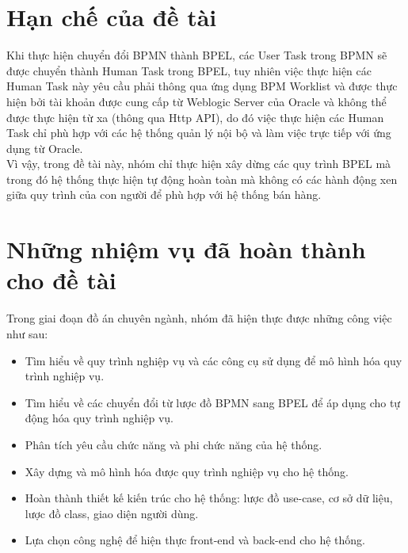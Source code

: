 \section{Hạn chế của đề tài}
\hspace{0.5cm} Khi thực hiện chuyển đổi BPMN thành BPEL, các User Task trong BPMN sẽ được chuyển thành Human Task trong BPEL, tuy nhiên việc thực hiện các Human Task này yêu cầu phải thông qua ứng dụng BPM Worklist và được thực hiện bởi tài khoản được cung cấp từ Weblogic Server của Oracle và không thể được thực hiện từ xa (thông qua Http API), do đó việc thực hiện các Human Task chỉ phù hợp với các hệ thống quản lý nội bộ và làm việc trực tiếp với ứng dụng từ Oracle. \\

Vì vậy, trong đề tài này, nhóm chỉ thực hiện xây dừng các quy trình BPEL mà trong đó hệ thống thực hiện tự động hoàn toàn mà không có các hành động xen giữa quy trình của con người để phù hợp với hệ thống bán hàng.


\section{Những nhiệm vụ đã hoàn thành cho đề tài}
Trong giai đoạn đồ án chuyên ngành, nhóm đã hiện thực được những công việc như sau:
\begin{itemize}
    \item Tìm hiểu về quy trình nghiệp vụ và các công cụ sử dụng để mô hình hóa quy trình nghiệp vụ.
    \item Tìm hiểu về các chuyển đổi từ lược đồ BPMN sang BPEL để áp dụng cho tự động hóa quy trình nghiệp vụ.
    \item Phân tích yêu cầu chức năng và phi chức năng của hệ thống.
    \item Xây dựng và mô hình hóa được quy trình nghiệp vụ cho hệ thống.
    \item Hoàn thành thiết kế kiến trúc cho hệ thống: lược đồ use-case, cơ sở dữ liệu, lược đồ class, giao diện người dùng.
    \item  Lựa chọn công nghệ để hiện thực front-end và back-end cho hệ thống.
\end{itemize}




